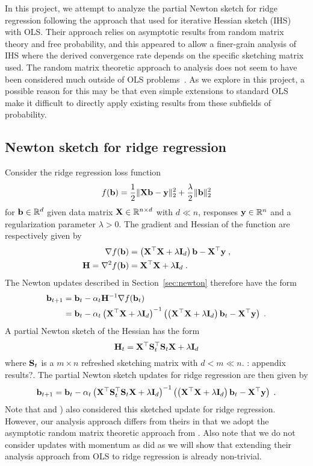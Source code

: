 In this project, we attempt to analyze the partial Newton sketch for ridge regression following the approach that \citet{Lacotte:2020} used for iterative Hessian sketch (IHS) with OLS. Their approach relies on asymptotic results from random matrix theory and free probability, and this appeared to allow a finer-grain analysis of IHS where the derived convergence rate depends on the specific sketching matrix used. The random matrix theoretic approach to analysis does not seem to have been considered much outside of OLS problems~\citep{Dobriban:2019,Lacotte:2020b}. As we explore in this project, a possible reason for this may be that even simple extensions to standard OLS make it difficult to directly apply existing results from these subfields of probability.


\subsection{Newton sketch for ridge regression} \label{sec:ridgesketch}

Consider the ridge regression loss function
\[
f(\mathbf{b}) = \frac{1}{2}\|\mathbf{X}\mathbf{b}-\mathbf{y}\|_2^2 + \frac{\lambda}{2}\|\mathbf{b}\|_2^2
\]
for $\mathbf{b}\in\mathbb{R}^d$ given data matrix $\mathbf{X}\in\mathbb{R}^{n\times d}$ with $d\ll n$, responses $\mathbf{y}\in\mathbb{R}^n$ and a regularization parameter $\lambda>0$. The gradient and Hessian of the function are respectively given by
\begin{align*}
\nabla f(\mathbf{b}) &= \left(\mathbf{X}^\top\mathbf{X}+\lambda\mathbf{I}_d\right)\mathbf{b} - \mathbf{X}^\top\mathbf{y} \;, \\
\mathbf{H} = \nabla^2f(\mathbf{b}) &= \mathbf{X}^\top\mathbf{X}+\lambda\mathbf{I}_d \;.
\end{align*}
The Newton updates described in Section~\ref{sec:newton} therefore have the form
\begin{align*}
\mathbf{b}_{t+1} &= \mathbf{b}_t - \alpha_t\mathbf{H}^{-1}\nabla f(\mathbf{b}_t) \\
&= \mathbf{b}_t - \alpha_t\left(\mathbf{X}^\top\mathbf{X}+\lambda\mathbf{I}_d\right)^{-1}\left(\left(\mathbf{X}^\top\mathbf{X}+\lambda\mathbf{I}_d\right)\mathbf{b}_t-\mathbf{X}^\top\mathbf{y}\right) \;.
\end{align*}
A partial Newton sketch of the Hessian has the form
\[
\mathbf{H}_t = \mathbf{X}^\top\mathbf{S}_t^\top\mathbf{S}_t\mathbf{X} + \lambda\mathbf{I}_d
\]
where $\mathbf{S}_t$ is a $m\times n$ refreshed sketching matrix with $d<m\ll n$. \todo:\citet{Chowdhury:2018} appendix results?. The partial Newton sketch updates for ridge regression are then given by
\[
\mathbf{b}_{t+1} = \mathbf{b}_t - \alpha_t\left(\mathbf{X}^\top\mathbf{S}_t^\top\mathbf{S}_t\mathbf{X} + \lambda\mathbf{I}_d\right)^{-1}\left(\left(\mathbf{X}^\top\mathbf{X}+\lambda\mathbf{I}_d\right)\mathbf{b}_t-\mathbf{X}^\top\mathbf{y}\right) \;.
\]
Note that \citet{Chowdhury:2018} and \citet{Wang:2017}) also considered this sketched update for ridge regression. However, our analysis approach differs from theirs in that we adopt the asymptotic random matrix theoretic approach from \citet{Lacotte:2020}. Also note that we do not consider updates with momentum as \citet{Lacotte:2020} did as we will show that extending their analysis approach from OLS to ridge regression is already non-trivial.



